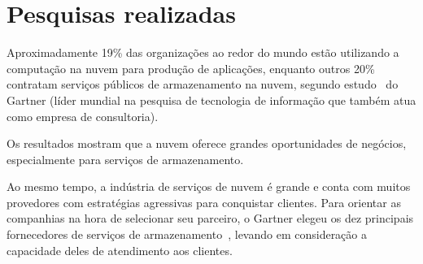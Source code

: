 \section{Pesquisas realizadas}

Aproximadamente 19\% das organizações ao redor do mundo estão utilizando a 
computação na nuvem para produção de aplicações, enquanto outros 20\% contratam 
serviços públicos de armazenamento na nuvem, segundo 
estudo~\cite{gartner-public-cloud-services} do Gartner (líder mundial na pesquisa de 
tecnologia de informação que também atua como empresa de consultoria).


\cite{gartner-one-third}

Os resultados mostram que a nuvem oferece grandes oportunidades de negócios,
especialmente para serviços de armazenamento. 

Ao mesmo tempo, a indústria de serviços de nuvem é grande e conta com muitos 
provedores com estratégias agressivas para conquistar clientes. Para orientar as 
companhias na hora de selecionar seu parceiro, o Gartner elegeu os dez principais 
fornecedores de serviços de armazenamento~\cite{gartner-top-10}, levando em 
consideração a capacidade deles de atendimento aos clientes.

